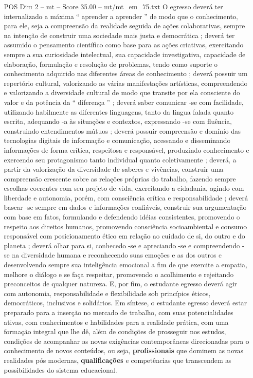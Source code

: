 \begin{textsample}{POS Dim 2 – mt – Score 35.00 – mt/mt\_em\_75.txt}
O egresso deverá ter internalizado a máxima “ aprender a aprender ” de modo que o conhecimento, para ele, seja a compreensão da realidade seguida de ações colaborativas, sempre na intenção de construir uma sociedade mais justa e democrática ; deverá ter assumido o pensamento científico como base para as ações criativas, exercitando sempre a sua curiosidade intelectual, sua capacidade investigativa, capacidade de elaboração, formulação e resolução de problemas, tendo como suporte o conhecimento adquirido nas diferentes áreas de conhecimento ; deverá possuir um repertório cultural, valorizando as várias manifestações artísticas, compreendendo e valorizando a diversidade cultural de modo que transite por ela consciente do valor e da potência da “ diferença ” ; deverá saber comunicar -se com facilidade, utilizando habilmente as diferentes linguagens, tanto da língua falada quanto escrita, adequando -a às situações e contextos, expressando -se com fluência, construindo entendimentos mútuos ; deverá possuir compreensão e domínio das tecnologias digitais de informação e comunicação, acessando e disseminando informações de forma crítica, respeitosa e responsável, produzindo conhecimento e exercendo seu protagonismo tanto individual quanto coletivamente ; deverá, a partir da valorização da diversidade de saberes e vivências, construir uma compreensão crescente sobre as relações próprias do trabalho, fazendo sempre escolhas coerentes com seu projeto de vida, exercitando a cidadania, agindo com liberdade e autonomia, porém, com consciência crítica e responsabilidade ; deverá basear -se sempre em dados e informações confiáveis, construir sua argumentação com base em fatos, formulando e defendendo idéias consistentes, promovendo o respeito aos direitos humanos, promovendo consciência socioambiental e consumo responsável com posicionamento ético em relação ao cuidado de si, do outro e do planeta ; deverá olhar para si, conhecedo -se e apreciando -se e compreendendo -se na diversidade humana e reconhecendo suas emoções e as dos outros e desenvolvendo sempre sua inteligência emocional a fim de que exercite a empatia, melhore o diálogo e se faça respeitar, promovendo o acolhimento e rejeitando preconceitos de qualquer natureza.
E, por fim, o estudante egresso deverá agir com autonomia, responsabilidade e flexibilidade sob princípios éticos, democráticos, inclusivos e solidários.
Em síntese, o estudante egresso deverá estar preparado para a inserção no mercado de trabalho, com suas potencialidades ativas, com conhecimentos e habilidades para a realidade prática, com uma formação integral que lhe dê, além de condições de prosseguir nos estudos, condições de acompanhar as novas exigências contemporâneas direcionadas para o conhecimento de novos conteúdos, ou seja, \textbf{profissionais} que dominem as novas realidades pós modernas, \textbf{qualificações} e competências que transcendem as possibilidades do sistema educacional.

\end{textsample}
